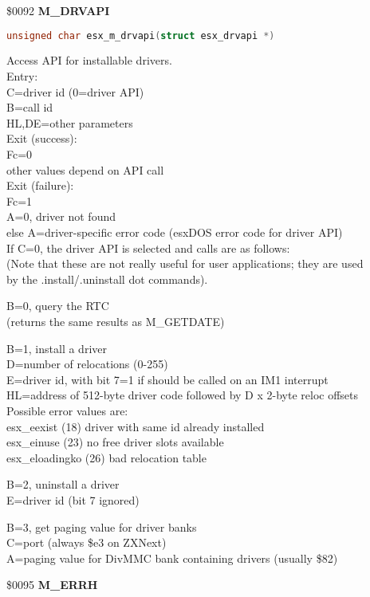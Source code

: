 \$0092 \textbf{M\_DRVAPI}

\begin{lstlisting}[language=C]
unsigned char esx_m_drvapi(struct esx_drvapi *)
\end{lstlisting}

Access API for installable drivers.\\
Entry:\\
C=driver id (0=driver API)\\
B=call id\\
HL,DE=other parameters\\
Exit (success):\\
Fc=0\\
other values depend on API call\\
Exit (failure):\\
Fc=1\\
A=0, driver not found\\
else A=driver-specific error code (esxDOS error code for driver API)\\
If C=0, the driver API is selected and calls are as follows:\\
(Note that these are not really useful for user applications; they are used\\
by the .install/.uninstall dot commands).

B=0, query the RTC\\
(returns the same results as M\_GETDATE)

B=1, install a driver\\
D=number of relocations (0-255)\\
E=driver id, with bit 7=1 if should be called on an IM1 interrupt\\
HL=address of 512-byte driver code followed by D x 2-byte reloc offsets\\
Possible error values are:\\
esx\_eexist (18) driver with same id already installed\\
esx\_einuse (23) no free driver slots available\\
esx\_eloadingko (26) bad relocation table

B=2, uninstall a driver\\
E=driver id (bit 7 ignored)

B=3, get paging value for driver banks\\
C=port (always \$e3 on ZXNext)\\
A=paging value for DivMMC bank containing drivers (usually \$82)

\$0095 \textbf{M\_ERRH}


